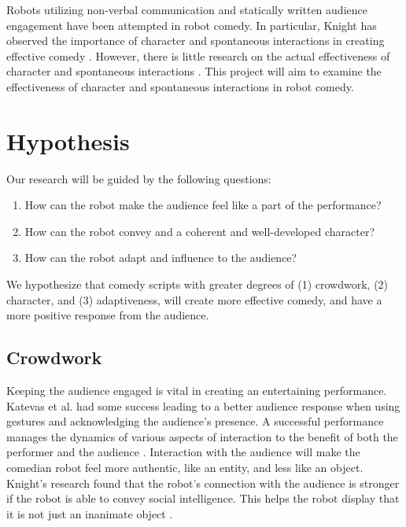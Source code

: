 \documentclass[onecolumn, draftclsnofoot,10pt, compsoc]{IEEEtran}
\begin{document}

Robots utilizing non-verbal communication and statically written audience engagement have been attempted in robot comedy. In particular, Knight has observed the importance of character and spontaneous interactions in creating effective comedy \cite{KnightEightLessons:2011}. However, there is little research on the actual effectiveness of character and spontaneous interactions \cite{KatevasRobot:2014}. This project will aim to examine the effectiveness of character and spontaneous interactions in robot comedy.

\section{Hypothesis}

Our research will be guided by the following questions:
\begin{enumerate}[\IEEEsetlabelwidth{6)}]
\item How can the robot make the audience feel like a part of the performance?
\item How can the robot convey and a coherent and well-developed character?
\item How can the robot adapt and influence to the audience?
\end{enumerate}

We hypothesize that comedy scripts with greater degrees of (1) crowdwork, (2) character, and (3) adaptiveness, will create more effective comedy, and have a more positive response from the audience.

\subsection{Crowdwork}

Keeping the audience engaged is vital in creating an entertaining performance. Katevas et al. had some success leading to a better audience response when using gestures and acknowledging the audience's presence. A successful performance manages the dynamics of various aspects of interaction to the benefit of both the performer and the audience \cite{RobotComedyLab:2015}. Interaction with the audience will make the comedian robot feel more authentic, like an entity, and less like an object. Knight's research found that the robot's connection with the audience is stronger if the robot is able to convey social intelligence. This helps the robot display that it is not just an inanimate object \cite {KnightEightLessons:2011}.
\end{document}
